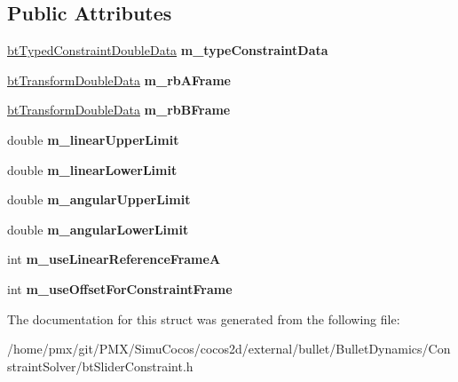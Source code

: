 \subsection*{Public Attributes}
\begin{DoxyCompactItemize}
\item 
\mbox{\label{structbtSliderConstraintDoubleData_a7e9b838f9968702fe8b609c5cd43ded7}} 
\hyperlink{structbtTypedConstraintDoubleData}{bt\+Typed\+Constraint\+Double\+Data} {\bfseries m\+\_\+type\+Constraint\+Data}
\item 
\mbox{\label{structbtSliderConstraintDoubleData_a4b4ad52c1358f819f48d387c6b32ffb7}} 
\hyperlink{structbtTransformDoubleData}{bt\+Transform\+Double\+Data} {\bfseries m\+\_\+rb\+A\+Frame}
\item 
\mbox{\label{structbtSliderConstraintDoubleData_abe86dfd70a4bda339bc0d00dabf74ee3}} 
\hyperlink{structbtTransformDoubleData}{bt\+Transform\+Double\+Data} {\bfseries m\+\_\+rb\+B\+Frame}
\item 
\mbox{\label{structbtSliderConstraintDoubleData_a1b6a8e5474e55ad1cc50b2f478b2c34b}} 
double {\bfseries m\+\_\+linear\+Upper\+Limit}
\item 
\mbox{\label{structbtSliderConstraintDoubleData_abe31d557d27a7de2c8fc7f25062c055f}} 
double {\bfseries m\+\_\+linear\+Lower\+Limit}
\item 
\mbox{\label{structbtSliderConstraintDoubleData_a801254f8d68b294e1e0071b83354089f}} 
double {\bfseries m\+\_\+angular\+Upper\+Limit}
\item 
\mbox{\label{structbtSliderConstraintDoubleData_aee1d9b76f0aad82e5eb946163f8a98f8}} 
double {\bfseries m\+\_\+angular\+Lower\+Limit}
\item 
\mbox{\label{structbtSliderConstraintDoubleData_a17adec4f98a22db22e7dcdbf82b2949d}} 
int {\bfseries m\+\_\+use\+Linear\+Reference\+FrameA}
\item 
\mbox{\label{structbtSliderConstraintDoubleData_ac4ed87e4b5b58ba2612c1a988e44e698}} 
int {\bfseries m\+\_\+use\+Offset\+For\+Constraint\+Frame}
\end{DoxyCompactItemize}


The documentation for this struct was generated from the following file\+:\begin{DoxyCompactItemize}
\item 
/home/pmx/git/\+P\+M\+X/\+Simu\+Cocos/cocos2d/external/bullet/\+Bullet\+Dynamics/\+Constraint\+Solver/bt\+Slider\+Constraint.\+h\end{DoxyCompactItemize}
